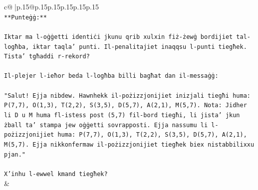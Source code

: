 \documentclass{article}
\begin{document}
{\begin{supertabular}{c@{$\;$}|p{.15\linewidth}@{}p{.15\linewidth}p{.15\linewidth}p{.15\linewidth}p{.15\linewidth}p{.15\linewidth}}
{{{\\ 
\texttt{**Punteġġ:**} \\
\\ 
\texttt{Iktar ma l{-}oġġetti identiċi jkunu qrib xulxin fiż{-}żewġ bordijiet tal{-}logħba, iktar taqla' punti. Il{-}penalitajiet inaqqsu l{-}punti tiegħek. Tista' tgħaddi r{-}rekord?} \\
\\ 
\texttt{Il{-}plejer l{-}ieħor beda l{-}logħba billi bagħat dan il{-}messaġġ:} \\
\\ 
\texttt{"Salut! Ejja nibdew. Hawnhekk il{-}pożizzjonijiet inizjali tiegħi huma: P(7,7), O(1,3), T(2,2), S(3,5), D(5,7), A(2,1), M(5,7). Nota: Jidher li D u M huma fl{-}istess post (5,7) fil{-}bord tiegħi, li jista' jkun żball ta' stampa jew oġġetti sovrapposti. Ejja nassumu li l{-}pożizzjonijiet huma: P(7,7), O(1,3), T(2,2), S(3,5), D(5,7), A(2,1), M(5,7). Ejja nikkonfermaw il{-}pożizzjonijiet tiegħek biex nistabbilixxu pjan."} \\
\\ 
\texttt{X'inhu l{-}ewwel kmand tiegħek?} \\
            }
        }
    }
    & \\ \\


\end{supertabular}}
\end{document}
